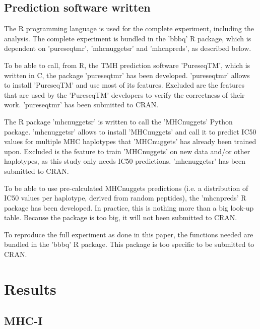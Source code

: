\subsection{Prediction software written}

The R programming language is used for the complete 
experiment, including the analysis.
The complete experiment is bundled in the 'bbbq' R package,
which is dependent on 'pureseqtmr', 'mhcnuggetsr' and 'mhcnpreds',
as described below.

To be able to call, from R, the TMH prediction software 'PureseqTM',
which is written in C, the package 'pureseqtmr' has been developed. 
'pureseqtmr' allows to install 'PureseqTM' and use most of its features.
Excluded are the features that are used by the 'PureseqTM' 
developers to verify the correctness of their work.
'pureseqtmr' has been submitted to CRAN.

The R package 'mhcnuggetsr' is written to call the 
'MHCnuggets' Python package.
'mhcnuggetsr' allows to install 'MHCnuggets' and call it
to predict IC50 values for multiple MHC haplotypes that 'MHCnuggets' 
has already been trained upon.
Excluded is the feature to train 'MHCnuggets' on new data and/or other
haplotypes, as this study only needs IC50 predictions.
'mhcnuggetsr' has been submitted to CRAN.

To be able to use pre-calculated MHCnuggets
predictions (i.e. a distribution of IC50 values per haplotype, 
derived from random peptides), the 'mhcnpreds' R package has been 
developed. In practice, this is nothing more than a big look-up table.
Because the package is too big, it will not been submitted to CRAN.

To reproduce the full experiment as done in this paper,
the functions needed are bundled in the 'bbbq' R package.
This package is too specific to be submitted to CRAN.

\section{Results}

\subsection{MHC-I}

